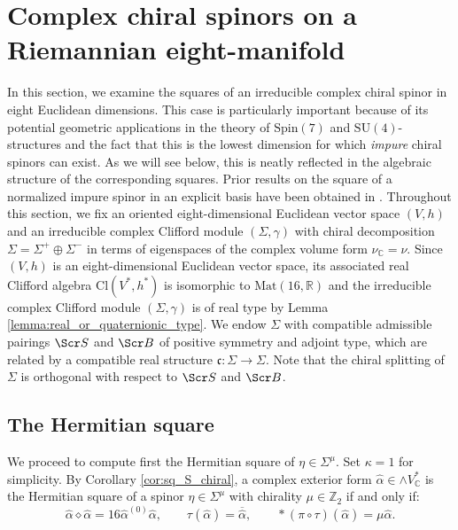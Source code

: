 \documentclass[10pt,a4paper,twoside,reqno]{amsart}
\theoremstyle{plain}
\theoremstyle{definition}
\theoremstyle{remark}
\newcommand{\Mat}{\mathrm{Mat}}
\def\Z{\mathbb{Z}}
\def\C{\mathbb{C}}
\def\R{\mathbb{R}}
\def\scB{\Scr B}
\def\scS{\Scr S}
\def\Spin{\mathrm{Spin}}
\def\Spin{\mathrm{Spin}}
\def\SU{\mathrm{SU}}
\def\R{\mathbb{R}}
\begin{document}
\section{Complex chiral spinors on a Riemannian eight-manifold}
\label{section:8dRiemannian}


In this section, we examine the squares of an irreducible complex chiral spinor in eight Euclidean dimensions. This case is particularly important because of its potential geometric applications in the theory of $\Spin(7)$ and $\SU(4)$-structures and the fact that this is the lowest dimension for which \emph{impure} chiral spinors can exist. As we will see below, this is neatly reflected in the algebraic structure of the corresponding squares. Prior results on the square of a normalized impure spinor in an explicit basis have been obtained in \cite{Bhoja:2023dgk,Krasnov2024}. Throughout this section, we fix an oriented eight-dimensional Euclidean vector space $(V,h)$ and an irreducible complex Clifford module $(\Sigma,\gamma)$ with chiral decomposition $\Sigma=\Sigma^{+}\oplus\Sigma^{-}$ in terms of eigenspaces of the complex volume form $\nu_{\C} = \nu$. Since $(V,h)$ is an eight-dimensional Euclidean vector space, its associated real Clifford algebra $\mathrm{Cl}(V^*,h^*)$ is isomorphic to $\Mat(16,\R)$ and the irreducible complex Clifford module $(\Sigma,\gamma)$ is of real type by Lemma \ref{lemma:real_or_quaternionic_type}. We endow $\Sigma$ with compatible admissible pairings $\scS$ and $\scB$ of positive symmetry and adjoint type, which are related by a compatible real structure $\mathfrak{c}\colon\Sigma\to\Sigma$. Note that the chiral splitting of $\Sigma$ is orthogonal with respect to $\scS$ and $\scB$.


\subsection{The Hermitian square}


We proceed to compute first the Hermitian square of $\eta \in \Sigma^{\mu}$. Set $\kappa=1$ for simplicity. By Corollary \ref{cor:sq_S_chiral}, a complex exterior form $\widehat{\alpha}\in\wedge V^*_\C$ is the Hermitian square of a spinor $\eta\in\Sigma^{\mu}$ with chirality $\mu\in\Z_2$ if and only if:
\begin{equation*}
\widehat{\alpha}\diamond\widehat{\alpha}=16\widehat{\alpha}^{(0)}\widehat{\alpha},\qquad \tau(\widehat{\alpha})=\overline{\widehat{\alpha}},\qquad *(\pi\circ\tau)(\widehat{\alpha})=\mu\widehat{\alpha}.   
\end{equation*}
\end{document}
